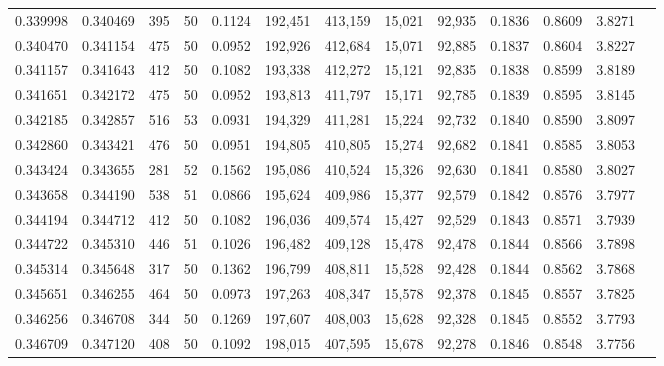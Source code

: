 \begin{tabular}{rrrrrrrrrrrrr}
0.339998 & 0.340469 &   395 &  50 &                                     0.1124 & 192,451 & 413,159 &  15,021 &  92,935 & 0.1836 & 0.8609 & 3.8271 \\
0.340470 & 0.341154 &   475 &  50 &                                     0.0952 & 192,926 & 412,684 &  15,071 &  92,885 & 0.1837 & 0.8604 & 3.8227 \\
0.341157 & 0.341643 &   412 &  50 &                                     0.1082 & 193,338 & 412,272 &  15,121 &  92,835 & 0.1838 & 0.8599 & 3.8189 \\
0.341651 & 0.342172 &   475 &  50 &                                     0.0952 & 193,813 & 411,797 &  15,171 &  92,785 & 0.1839 & 0.8595 & 3.8145 \\
0.342185 & 0.342857 &   516 &  53 &                                     0.0931 & 194,329 & 411,281 &  15,224 &  92,732 & 0.1840 & 0.8590 & 3.8097 \\
0.342860 & 0.343421 &   476 &  50 &                                     0.0951 & 194,805 & 410,805 &  15,274 &  92,682 & 0.1841 & 0.8585 & 3.8053 \\
0.343424 & 0.343655 &   281 &  52 &                                     0.1562 & 195,086 & 410,524 &  15,326 &  92,630 & 0.1841 & 0.8580 & 3.8027 \\
0.343658 & 0.344190 &   538 &  51 &                                     0.0866 & 195,624 & 409,986 &  15,377 &  92,579 & 0.1842 & 0.8576 & 3.7977 \\
0.344194 & 0.344712 &   412 &  50 &                                     0.1082 & 196,036 & 409,574 &  15,427 &  92,529 & 0.1843 & 0.8571 & 3.7939 \\
0.344722 & 0.345310 &   446 &  51 &                                     0.1026 & 196,482 & 409,128 &  15,478 &  92,478 & 0.1844 & 0.8566 & 3.7898 \\
0.345314 & 0.345648 &   317 &  50 &                                     0.1362 & 196,799 & 408,811 &  15,528 &  92,428 & 0.1844 & 0.8562 & 3.7868 \\
0.345651 & 0.346255 &   464 &  50 &                                     0.0973 & 197,263 & 408,347 &  15,578 &  92,378 & 0.1845 & 0.8557 & 3.7825 \\
0.346256 & 0.346708 &   344 &  50 &                                     0.1269 & 197,607 & 408,003 &  15,628 &  92,328 & 0.1845 & 0.8552 & 3.7793 \\
0.346709 & 0.347120 &   408 &  50 &                                     0.1092 & 198,015 & 407,595 &  15,678 &  92,278 & 0.1846 & 0.8548 & 3.7756 \\

\end{tabular}
